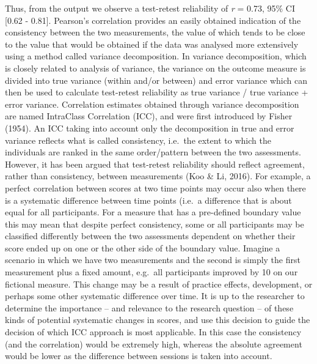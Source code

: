 \documentclass[english,,man,floatsintext]{apa6}
\begin{document}
Thus, from the output we observe a test-retest reliability of \emph{r} = 0.73, 95\% CI {[}0.62 - 0.81{]}. Pearson's correlation provides an easily obtained indication of the consistency between the two measurements, the value of which tends to be close to the value that would be obtained if the data was analysed more extensively using a method called variance decomposition. In variance decomposition, which is closely related to analysis of variance, the variance on the outcome measure is divided into true variance (within and/or between) and error variance which can then be used to calculate test-retest reliability as true variance / true variance + error variance. Correlation estimates obtained through variance decomposition are named IntraClass Correlation (ICC), and were first introduced by Fisher (1954). An ICC taking into account only the decomposition in true and error variance reflects what is called consistency, i.e.~the extent to which the individuals are ranked in the same order/pattern between the two assessments. However, it has been argued that test-retest reliability should reflect agreement, rather than consistency, between measurements (Koo \& Li, 2016). For example, a perfect correlation between scores at two time points may occur also when there is a systematic difference between time points (i.e.~a difference that is about equal for all participants. For a measure that has a pre-defined boundary value this may mean that despite perfect consistency, some or all participants may be classified differently between the two assessments dependent on whether their score ended up on one or the other side of the boundary value. Imagine a scenario in which we have two measurements and the second is simply the first measurement plus a fixed amount, e.g.~all participants improved by 10 on our fictional measure. This change may be a result of practice effects, development, or perhaps some other systematic difference over time. It is up to the researcher to determine the importance -- and relevance to the research question -- of these kinds of potential systematic changes in scores, and use this decision to guide the decision of which ICC approach is most applicable. In this case the consistency (and the correlation) would be extremely high, whereas the absolute agreement would be lower as the difference between sessions is taken into account.
\end{document}
